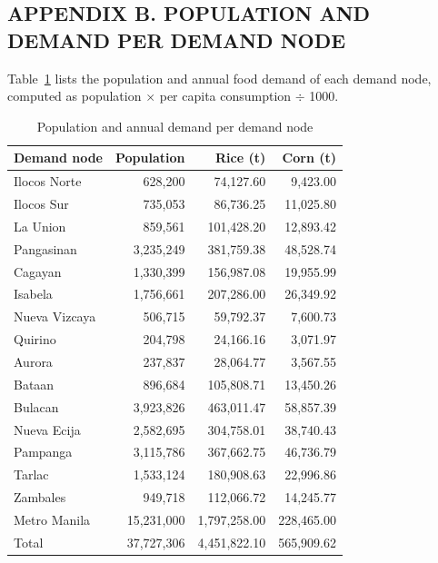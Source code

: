 \documentclass{icsthesis}
\begin{document}
\begin{mainmatter}
\section{APPENDIX B. POPULATION AND DEMAND PER DEMAND NODE}
Table~\ref{tab:appB} lists the population and annual food demand of each demand node, computed as population $\times$ per capita consumption $\div$ 1000.

\begin{table}[htbp]
\caption{Population and annual demand per demand node}
\label{tab:appB}
\centering
\small
\setlength{\tabcolsep}{3pt}
\begin{tabular}{lrrr}
\hline
Demand node & Population & Rice (t) & Corn (t) \\
\hline
Ilocos Norte  & 628,200    & 74,127.60    & 9,423.00 \\
Ilocos Sur    & 735,053    & 86,736.25    & 11,025.80 \\
La Union      & 859,561    & 101,428.20   & 12,893.42 \\
Pangasinan    & 3,235,249  & 381,759.38   & 48,528.74 \\
Cagayan       & 1,330,399  & 156,987.08   & 19,955.99 \\
Isabela       & 1,756,661  & 207,286.00   & 26,349.92 \\
Nueva Vizcaya & 506,715    & 59,792.37    & 7,600.73 \\
Quirino       & 204,798    & 24,166.16    & 3,071.97 \\
Aurora        & 237,837    & 28,064.77    & 3,567.55 \\
Bataan        & 896,684    & 105,808.71   & 13,450.26 \\
Bulacan       & 3,923,826  & 463,011.47   & 58,857.39 \\
Nueva Ecija   & 2,582,695  & 304,758.01   & 38,740.43 \\
Pampanga      & 3,115,786  & 367,662.75   & 46,736.79 \\
Tarlac        & 1,533,124  & 180,908.63   & 22,996.86 \\
Zambales      & 949,718    & 112,066.72   & 14,245.77 \\
Metro Manila  & 15,231,000 & 1,797,258.00 & 228,465.00 \\
\hline
Total         & 37,727,306 & 4,451,822.10 & 565,909.62 \\
\hline
\end{tabular}
\end{table}

\end{mainmatter}
\end{document}
